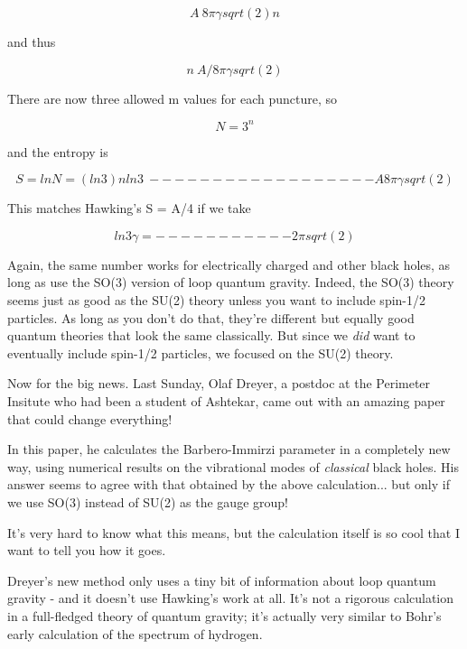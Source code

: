 $$

A ~ 8 \pi  \gamma  sqrt(2) n 
$$
    
and thus


$$

n ~ A / 8 \pi  \gamma  sqrt(2)
$$
    
There are now three allowed m values for each puncture, so


$$

N = 3^{n}
$$
    
and the entropy is


$$

S = ln N

  = (ln 3) n


           ln 3
  ~ ------------------ A
    8 \pi  \gamma  sqrt(2)      
$$
    
This matches Hawking's S = A/4 if we take


$$

            ln 3
\gamma  = -----------
        2 \pi  sqrt(2)
$$
    
Again, the same number works for electrically charged and other black
holes, as long as use the SO(3) version of loop quantum gravity.
Indeed, the SO(3) theory seems just as good as the SU(2) theory unless
you want to include spin-1/2 particles.  As long as you don't do that,
they're different but equally good quantum theories that look the same
classically.  But since we \emph{did} want to eventually include spin-1/2
particles, we focused on the SU(2) theory.

Now for the big news.  Last Sunday, Olaf Dreyer, a postdoc at the
Perimeter Insitute who had been a student of Ashtekar, came out with an
amazing paper that could change everything!

In this paper, he calculates the Barbero-Immirzi parameter in a
completely new way, using numerical results on the vibrational modes of
\emph{classical} black holes.  His answer seems to agree with that obtained
by the above calculation...  but only if we use SO(3) instead of SU(2)
as the gauge group!

It's very hard to know what this means, but the calculation itself is so
cool that I want to tell you how it goes.

Dreyer's new method only uses a tiny bit of information about loop
quantum gravity - and it doesn't use Hawking's work at all.  It's not a
rigorous calculation in a full-fledged theory of quantum gravity; it's
actually very similar to Bohr's early calculation of the spectrum of
hydrogen.

